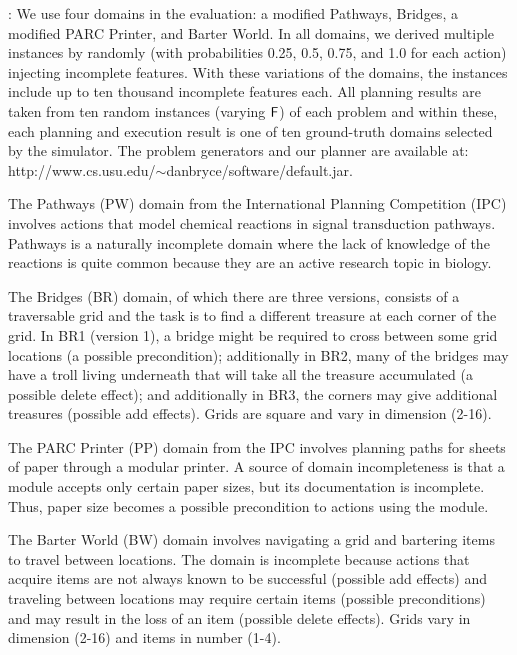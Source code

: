 \documentclass[letterpaper]{article}
\def\und#1{\noindent{\bf #1}:}
\begin{document}
\und{Domains} We use four domains in the evaluation: a modified Pathways,
Bridges,  a modified PARC Printer, and Barter World.  In
all domains, we derived multiple instances by randomly (with probabilities 0.25,
0.5, 0.75, and 1.0 for each action) injecting incomplete  features.   
With these variations of the domains, the instances include up to ten thousand
incomplete  features each. All planning results are taken from ten random
instances (varying $\sf F$) of each problem and within these, each planning
and execution result is one of ten ground-truth domains selected by the
simulator. The problem generators and our planner are available at:
http://www.cs.usu.edu/$\sim$danbryce/software/default.jar.

The Pathways (PW) domain from the International Planning Competition  (IPC)
involves actions that model chemical reactions in signal transduction pathways. 
Pathways is a naturally incomplete domain where the lack of knowledge of the
reactions is quite common because they are an active research topic in biology.

The Bridges (BR) domain, of which there are three versions, consists of a
traversable grid and the task is to find a different treasure at each corner of
the grid. In BR1 (version 1), a bridge might be required  to cross between some
grid locations (a possible precondition); additionally in BR2, many of the
bridges may have a troll living underneath that will take all the treasure
accumulated (a possible delete effect); and additionally in BR3, the corners may
give additional treasures (possible add effects).  Grids are square and vary in
dimension (2-16).

The PARC Printer (PP) domain from the IPC involves planning paths for sheets of
paper through a modular printer.  A source of domain incompleteness is that a
module accepts only certain paper sizes, but its documentation is incomplete. 
Thus, paper size becomes a possible precondition to actions using the module.

The Barter World (BW) domain involves navigating a grid and bartering items to
travel between locations.  The domain is incomplete because actions that acquire
 items are not always known to be successful (possible add effects) and
 traveling between locations may require
certain items (possible preconditions) and may result in the loss of an item
(possible delete effects). Grids vary in dimension (2-16) and items in number
(1-4).
\end{document}
